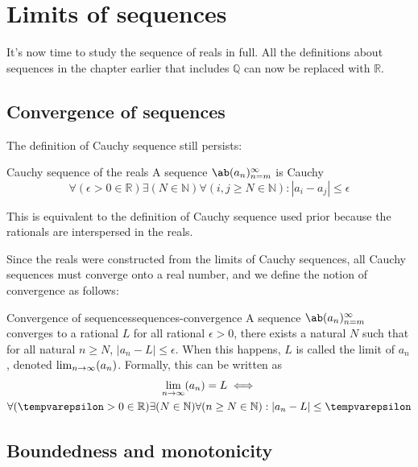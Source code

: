 \chapter{Limits of sequences}

It's now time to study the sequence of reals in full. All the definitions about sequences in the chapter earlier that includes $\mathbb{Q}$ can now be replaced with $\mathbb{R}$.

\section{Convergence of sequences}

The definition of Cauchy sequence still persists:
\begin{df}{Cauchy sequence of the reals}{}
  A sequence \(\sequence{a_n}{n = m}{\infty}\) is Cauchy \ifft
  \begin{equation}
    \forall (\epsilon > 0 \in \mathbb{R}) \exists (N \in \mathbb{N}) \forall (i, j \geq N \in \mathbb{N}) : |a_i - a_j| \leq \epsilon
  \end{equation}
\end{df}
This is equivalent to the definition of Cauchy sequence used prior because the rationals are interspersed in the reals.

Since the reals were constructed from the limits of Cauchy sequences, all Cauchy sequences must converge onto a real number, and we define the notion of convergence as follows:
\begin{df}{Convergence of sequences}{sequences-convergence}
  A sequence $\sequence{a_n}{n = m}{\infty}$ converges to a rational $L$ \ifft for all rational $\epsilon > 0$, there exists a natural $N$ such that for all natural $n \geq N$, $|a_n - L| \leq \epsilon$. When this happens, $L$ is called the limit of $a_n$, denoted $\lim_{n \rightarrow \infty} (a_n)$. Formally, this can be written as
  \begin{multline}
    \lim_{n \appr \infty} (a_n) = L \iff \\
    \forall (\epsilon > 0 \in \mathbb{R}) \exists (N \in \mathbb{N}) \forall (n \geq N \in \mathbb{N}) : |a_n - L| \leq \epsilon
  \end{multline}
\end{df}

\section{Boundedness and monotonicity}

